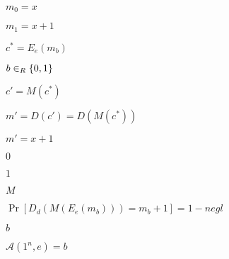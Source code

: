 \documentclass[10pt]{book}
\begin{document}
\begin{mdSnippets}
\begin{mdInlineSnippet}
$m_0 = x$\end{mdInlineSnippet}%
\begin{mdInlineSnippet}[0d590a835b5b488f7511966ac6cdc9fb]%
$m_1 = x + 1$\end{mdInlineSnippet}%
\begin{mdInlineSnippet}[72363e6a2c09a846643053b07c46665e]%
$c^* = E_e(m_b)$\end{mdInlineSnippet}%
\begin{mdInlineSnippet}%
$b \in_R \{0,1\}$\end{mdInlineSnippet}%
\begin{mdInlineSnippet}[b6db7645094c920a7103fbbd8d4b2a8b]%
$c' = M(c^*)$\end{mdInlineSnippet}%
\begin{mdInlineSnippet}[2e8a8997007ea042026535fcce8cf10b]%
$m' = D(c') = D(M(c^*))$\end{mdInlineSnippet}%
\begin{mdInlineSnippet}%
$m' = x + 1$\end{mdInlineSnippet}%
\begin{mdInlineSnippet}%
$0$\end{mdInlineSnippet}%
\begin{mdInlineSnippet}[c4ca4238a0b923820dcc509a6f75849b]%
$1$\end{mdInlineSnippet}%
\begin{mdInlineSnippet}[69691c7bdcc3ce6d5d8a1361f22d04ac]%
$M$\end{mdInlineSnippet}%
\begin{mdInlineSnippet}[86ee4ea7c7a0b23c402782c011838916]%
$\Pr[D_d(M(E_e(m_b))) = m_b + 1] = 1 - negl$\end{mdInlineSnippet}%
\begin{mdInlineSnippet}%
$b$\end{mdInlineSnippet}%
\begin{mdInlineSnippet}[c3756a3108bedc440ee6eb34c0619164]%
$\mathcal{A}(1^n,e) = b$\end{mdInlineSnippet}%
\begin{mdDisplaySnippet}[10c8ac5ffc133bb4514f977197c5787c]%

\end{mdDisplaySnippet}
\end{mdSnippets}
\end{document}
